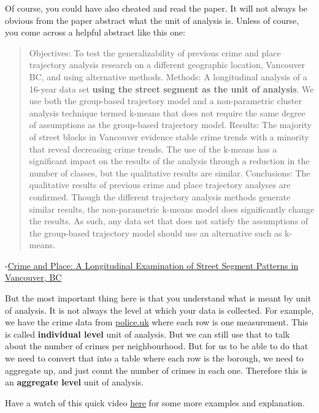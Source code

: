 \documentclass[]{book}
\theoremstyle{definition}
\theoremstyle{definition}
\theoremstyle{definition}
\theoremstyle{remark}
\begin{document}
Of course, you could have also cheated and read the paper. It will not
always be obvious from the paper abstract what the unit of analysis is.
Unless of course, you come across a helpful abstract like this one:

\begin{quote}
Objectives: To test the generalizability of previous crime and place
trajectory analysis research on a different geographic location,
Vancouver BC, and using alternative methods. Methods: A longitudinal
analysis of a 16-year data set \textbf{using the street segment as the
unit of analysis}. We use both the group-based trajectory model and a
non-parametric cluster analysis technique termed k-means that does not
require the same degree of assumptions as the group-based trajectory
model. Results: The majority of street blocks in Vancouver evidence
stable crime trends with a minority that reveal decreasing crime trends.
The use of the k-means has a significant impact on the results of the
analysis through a reduction in the number of classes, but the
qualitative results are similar. Conclusions: The qualitative results of
previous crime and place trajectory analyses are confirmed. Though the
different trajectory analysis methods generate similar results, the
non-parametric k-means model does significantly change the results. As
such, any data set that does not satisfy the assumptions of the
group-based trajectory model should use an alternative such as k-means.
\end{quote}

-\href{https://link.springer.com/article/10.1007/s10940-014-9228-3}{Crime
and Place: A Longitudinal Examination of Street Segment Patterns in
Vancouver, BC}

But the most important thing here is that you understand what is meant
by unit of analysis. It is not always the level at which your data is
collected. For example, we have the crime data from \url{police.uk}
where each row is one measurement. This is called \textbf{individual
level} unit of analysis. But we can still use that to talk about the
number of crimes per neighbourhood. But for us to be able to do that we
need to convert that into a table where each row is the borough, we need
to aggregate up, and just count the number of crimes in each one.
Therefore this is an \textbf{aggregate level} unit of analysis.

Have a watch of this quick video
\href{https://www.youtube.com/watch?v=XHXTR8jeEUg}{here} for some more
examples and explanation.
\end{document}

